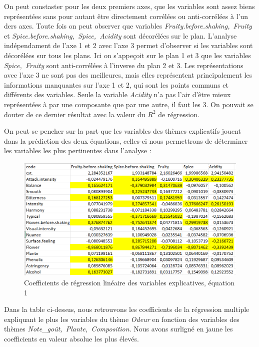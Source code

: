 \documentclass[a4paper,french,10pt]{article}
\begin{document}
On peut constaster pour les deux premiers axes, que les variables sont assez biens représentées sans pour autant être directement corrélées ou anti-corrélées à l'un ders axes. Toute fois on peut observer que variables \textit{Fruity.before.shaking,~Fruity} et \textit{Spice.before.shaking,~Spice,~Acidity} sont décorélées sur le plan. L'analyse indépendament de l'axe 1 et 2 avec l'axe 3 permet d'observer si les variables sont décorélées sur tous les plans. Ici on s'appeçoit sur le plan 1 et 3 que les variables \textit{Spice,~Fruity} sont anti-corrélées à l'inverse du plan 2 et 3. Les représentations avec l'axe 3 ne sont pas des meilleures, mais elles représentent principalement les informations manquantes sur l'axe 1 et 2, qui sont les points communs et différents des variables. Seule la variable \textit{Acidity} n'a pas l'air d'être mieux représentées à par une composante que par une autre, il faut les 3. On pouvait se douter de ce dernier résultat avec la valeur du $R^2$ de régression.\newline

On peut se pencher sur la part que les variables des thèmes explicatifs jouent dans la prédiction des deux équations, celles-ci nous permettrons de déterminer les variables les plus pertinentes dans l'analyse : 

\begin{figure}[htp] 
	\centering
	\includegraphics[scale=0.45]{images/Coeff_var_Eq1.png}
	\caption{Coefficients de régression linéaire des variables explicatives, équation 1}
\end{figure}

Dans la table ci-dessus, nous retrouvons les coefficients de la régression multiple expliquant le plus les variables du thème \textit{Odeur} en fonction des variables des thèmes \textit{Note\_goût,~Plante,~Composition}.
Nous avons surligné en jaune les coefficients en valeur absolue les plus élevés.
\end{document}
